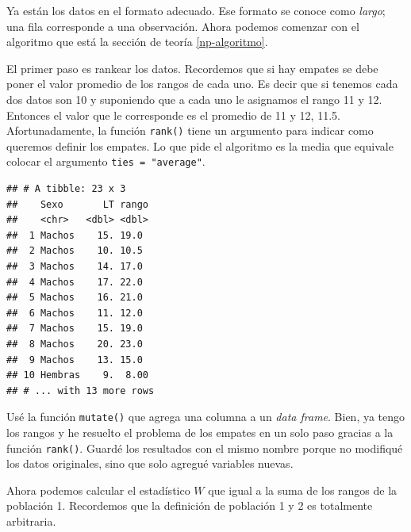 \documentclass[]{book}
\newenvironment{Shaded}{\begin{snugshade}}{\end{snugshade}}
\newcommand{\DataTypeTok}[1]{\textcolor[rgb]{0.13,0.29,0.53}{#1}}
\newcommand{\KeywordTok}[1]{\textcolor[rgb]{0.13,0.29,0.53}{\textbf{#1}}}
\newcommand{\NormalTok}[1]{#1}
\newcommand{\OperatorTok}[1]{\textcolor[rgb]{0.81,0.36,0.00}{\textbf{#1}}}
\newcommand{\StringTok}[1]{\textcolor[rgb]{0.31,0.60,0.02}{#1}}
\theoremstyle{definition}
\theoremstyle{definition}
\theoremstyle{definition}
\theoremstyle{remark}
\begin{document}
Ya están los datos en el formato adecuado. Ese formato se conoce como
\emph{largo}; una fila corresponde a una observación. Ahora podemos
comenzar con el algoritmo que está la sección de teoría
\ref{np-algoritmo}.

El primer paso es rankear los datos. Recordemos que si hay empates se
debe poner el valor promedio de los rangos de cada uno. Es decir que si
tenemos cada dos datos son 10 y suponiendo que a cada uno le asignamos
el rango 11 y 12. Entonces el valor que le corresponde es el promedio de
11 y 12, 11.5. Afortunadamente, la función \texttt{rank()} tiene un
argumento para indicar como queremos definir los empates. Lo que pide el
algoritmo es la media que equivale colocar el argumento
\texttt{ties\ =\ "average"}.

\begin{Shaded}
\end{Shaded}

\begin{verbatim}
## # A tibble: 23 x 3
##    Sexo       LT rango
##    <chr>   <dbl> <dbl>
##  1 Machos    15. 19.0 
##  2 Machos    10. 10.5 
##  3 Machos    14. 17.0 
##  4 Machos    17. 22.0 
##  5 Machos    16. 21.0 
##  6 Machos    11. 12.0 
##  7 Machos    15. 19.0 
##  8 Machos    20. 23.0 
##  9 Machos    13. 15.0 
## 10 Hembras    9.  8.00
## # ... with 13 more rows
\end{verbatim}

Usé la función \texttt{mutate()} que agrega una columna a un \emph{data
frame}. Bien, ya tengo los rangos y he resuelto el problema de los
empates en un solo paso gracias a la función \texttt{rank()}. Guardé los
resultados con el mismo nombre porque no modifiqué los datos originales,
sino que solo agregué variables nuevas.

Ahora podemos calcular el estadístico \(W\) que igual a la suma de los
rangos de la población 1. Recordemos que la definición de población 1 y
2 es totalmente arbitraria.
\end{document}
